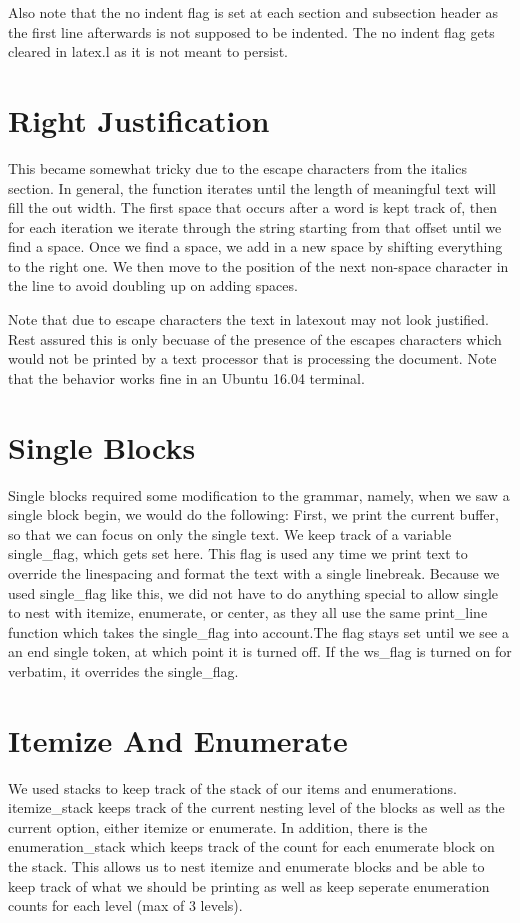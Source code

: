 Also note that the no indent flag is set at each section and subsection header as the first
line afterwards is not supposed to be indented. The no indent flag gets cleared in latex.l
as it is not meant to persist.

\section{Right Justification}
This became somewhat tricky due to the escape characters from the italics section. In
general, the function iterates until the length of meaningful text will fill the out width.
The first space that occurs after a word is kept track of, then for each iteration we
iterate through the string starting from that offset until we find a space. Once we find a 
space, we add in a new space by shifting everything to the right one. We then move to the 
position of the next non-space character in the line to avoid doubling up on adding spaces.

Note that due to escape characters the text in latexout may not look justified. Rest
assured this is only becuase of the presence of the escapes characters which would not be
printed by a text processor that is processing the document. Note that the behavior works
fine in an Ubuntu 16.04 terminal.

\section{Single Blocks}
Single blocks required some modification to the grammar, namely, when we saw a single block begin, we would do the following: First, we print the current buffer, so that we can focus on only the single text. We keep track of a variable single_flag, which gets set here. This flag is used any time we print text to override the linespacing and format the text with a single linebreak. Because we used single_flag like this, we did not have to do anything special to allow single to nest with itemize, enumerate, or center, as they all use the same print_line function which takes the single_flag into account.The flag stays set until we see a an end single token, at which point it is turned off. If the ws_flag is turned on for verbatim, it overrides the single_flag. 

\section{Itemize And Enumerate}
We used stacks to keep track of the stack of our items and enumerations. itemize_stack
keeps track of the current nesting level of the blocks as well as the current option, 
either itemize or enumerate. In addition, there is the enumeration_stack which keeps
track of the count for each enumerate block on the stack. This allows us to nest
itemize and enumerate blocks and be able to keep track of what we should be printing
as well as keep seperate enumeration counts for each level (max of 3 levels).


